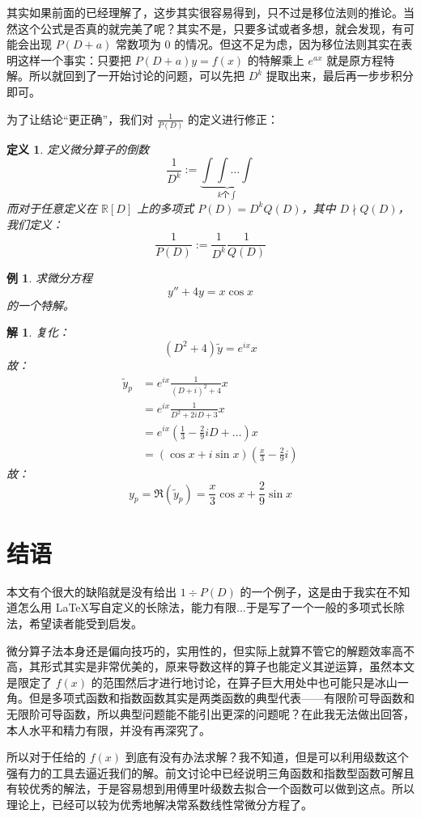 \documentclass{article}
\newtheorem{definition}{定义}[section]
\newtheorem{exm}{例}[section]
\newtheorem*{sol}{解}
\begin{document}
\noindent 其实如果前面的已经理解了，这步其实很容易得到，只不过是移位法则的推论。当然这个公式是否真的就完美了呢？其实不是，只要多试或者多想，就会发现，有可能会出现 $P(D+a)$ 常数项为 $0$ 的情况。但这不足为虑，因为移位法则其实在表明这样一个事实：只要把 $P(D+a)y=f(x)$ 的特解乘上 $e^{ax}$ 就是原方程特解。所以就回到了一开始讨论的问题，可以先把 $D^k$ 提取出来，最后再一步步积分即可。

\noindent 为了让结论“更正确”，我们对 $\frac{1}{P(D)}$ 的定义进行修正：
\begin{definition}
定义微分算子的倒数
$$
\frac{1}{D^k} := \underbrace{\int \int \ldots \int}_{k\text{个}\int}
$$
而对于任意定义在 $\mathbb{R}[D]$ 上的多项式 $P(D) = D^kQ(D)$，其中 $D \nmid Q(D)$，我们定义：
$$
\frac{1}{P(D)} := \frac{1}{D^k}\frac{1}{Q(D)}
$$
\end{definition}
\begin{exm}
求微分方程
$$
y''+4y=x\cos x
$$
的一个特解。
\end{exm}
\begin{sol}
复化：
$$
(D^2+4)\tilde{y} = e^{ix}x
$$
故：
\begin{align*}
    \tilde{y}_p &= e^{ix}\frac{1}{(D+i)^2 + 4}x\\
    &= e^{ix}\frac{1}{D^2+2iD+3}x\\
    &= e^{ix}(\frac{1}{3}-\frac{2}{9}iD+\ldots)x\\
    &= (\cos x + i\sin x)(\frac{x}{3}-\frac{2}{9}i)
\end{align*}
故：
$$
y_p = \Re(\tilde{y}_p) = \frac{x}{3}\cos x + \frac{2}{9}\sin x
$$
\end{sol}

\section{结语}

\noindent 本文有个很大的缺陷就是没有给出 $1 \div P(D)$ 的一个例子，这是由于我实在不知道怎么用 \LaTeX 写自定义的长除法，能力有限...于是写了一个一般的多项式长除法，希望读者能受到启发。

\noindent 微分算子法本身还是偏向技巧的，实用性的，但实际上就算不管它的解题效率高不高，其形式其实是非常优美的，原来导数这样的算子也能定义其逆运算，虽然本文是限定了 $f(x)$ 的范围然后才进行地讨论，在算子巨大用处中也可能只是冰山一角。但是多项式函数和指数函数其实是两类函数的典型代表——有限阶可导函数和无限阶可导函数，所以典型问题能不能引出更深的问题呢？在此我无法做出回答，本人水平和精力有限，并没有再深究了。

\noindent 所以对于任给的 $f(x)$ 到底有没有办法求解？我不知道，但是可以利用级数这个强有力的工具去逼近我们的解。前文讨论中已经说明三角函数和指数型函数可解且有较优秀的解法，于是容易想到用傅里叶级数去拟合一个函数可以做到这点。所以理论上，已经可以较为优秀地解决常系数线性常微分方程了。
\end{document}
